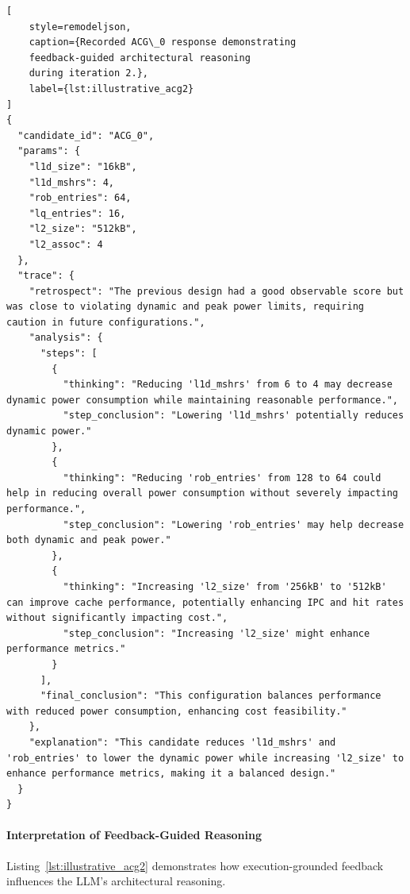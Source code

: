 \begin{lstlisting}[
    style=remodeljson,
    caption={Recorded ACG\_0 response demonstrating
    feedback-guided architectural reasoning
    during iteration 2.},
    label={lst:illustrative_acg2}
]
{
  "candidate_id": "ACG_0",
  "params": {
    "l1d_size": "16kB",
    "l1d_mshrs": 4,
    "rob_entries": 64,
    "lq_entries": 16,
    "l2_size": "512kB",
    "l2_assoc": 4
  },
  "trace": {
    "retrospect": "The previous design had a good observable score but was close to violating dynamic and peak power limits, requiring caution in future configurations.",
    "analysis": {
      "steps": [
        {
          "thinking": "Reducing 'l1d_mshrs' from 6 to 4 may decrease dynamic power consumption while maintaining reasonable performance.",
          "step_conclusion": "Lowering 'l1d_mshrs' potentially reduces dynamic power."
        },
        {
          "thinking": "Reducing 'rob_entries' from 128 to 64 could help in reducing overall power consumption without severely impacting performance.",
          "step_conclusion": "Lowering 'rob_entries' may help decrease both dynamic and peak power."
        },
        {
          "thinking": "Increasing 'l2_size' from '256kB' to '512kB' can improve cache performance, potentially enhancing IPC and hit rates without significantly impacting cost.",
          "step_conclusion": "Increasing 'l2_size' might enhance performance metrics."
        }
      ],
      "final_conclusion": "This configuration balances performance with reduced power consumption, enhancing cost feasibility."
    },
    "explanation": "This candidate reduces 'l1d_mshrs' and 'rob_entries' to lower the dynamic power while increasing 'l2_size' to enhance performance metrics, making it a balanced design."
  }
}
\end{lstlisting}

\paragraph{Interpretation of Feedback-Guided Reasoning}

Listing~\ref{lst:illustrative_acg2}
demonstrates how execution-grounded
feedback influences the LLM's
architectural reasoning.

